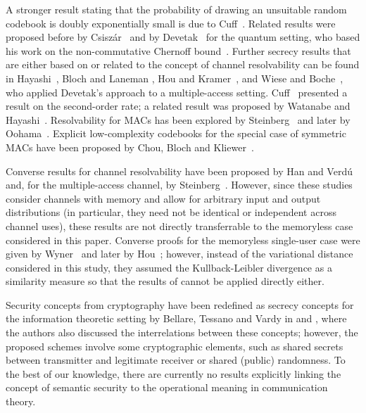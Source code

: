 \documentclass[journal]{IEEEtran}
\begin{document}
A stronger result stating that the probability of drawing an
unsuitable random codebook is doubly exponentially small is due to
Cuff~\cite{CuffSoftCovering}. Related results were proposed before by
Csiszár~\cite{CsiszarSecrecy} and by
Devetak~\cite{DevetakPrivateCapacity} for the quantum setting, who
based his work on the non-commutative Chernoff
bound~\cite{AhlswedeIdentification}. Further secrecy results that are
either based on or related to the concept of channel resolvability can
be found in Hayashi~\cite{HayashiResolvability}, Bloch and Laneman
\cite{BlochStrongSecrecy}, Hou and Kramer~\cite{HouEffectiveSecrecy},
and Wiese and Boche~\cite{WieseWiretap}, who applied Devetak's
approach to a multiple-access setting. Cuff~\cite{CuffSoftCovering}
presented a result on the second-order rate; a related result was
proposed by Watanabe and
Hayashi~\cite{WantanabeSecondOrder}. Resolvability for MACs has been
explored by Steinberg~\cite{SteinbergResolvability} and later by
Oohama~\cite{OohamaConverse}. Explicit low-complexity codebooks for
the special case of symmetric MACs have been proposed by Chou, Bloch
and Kliewer~\cite{ChouLowComplexity}.

Converse results for channel resolvability have been proposed by Han
and Verdú~\cite{HanApproximation} and, for the multiple-access
channel, by Steinberg~\cite{SteinbergResolvability}. However, since
these studies consider channels with memory and allow for arbitrary
input and output distributions (in particular, they need not be
identical or independent across channel uses), these results are not
directly transferrable to the memoryless case considered in this
paper. Converse proofs for the memoryless single-user case were given
by Wyner~\cite{WynerCommonInformation} and later by
Hou~\cite{HouPhDThesis}; however, instead of the variational distance
considered in this study, they assumed the Kullback-Leibler divergence
as a similarity measure so that the results of \cite{HouPhDThesis}
cannot be applied directly either.

Security concepts from cryptography have been redefined as secrecy
concepts for the information theoretic setting by Bellare, Tessano and
Vardy in \cite{BellareSemantic} and \cite{BellareCryptographic}, where
the authors also discussed the interrelations between these concepts;
however, the proposed schemes involve some cryptographic elements,
such as shared secrets between transmitter and legitimate receiver or
shared (public) randomness. To the best of our knowledge, there are
currently no results explicitly linking the concept of semantic
security to the operational meaning in communication theory.
\end{document}
